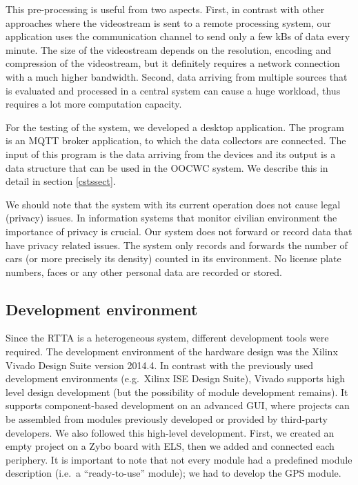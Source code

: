 \documentclass[b5paper,12pt]{report}
\theoremstyle{definition}
\begin{document}
This pre-processing is useful from two aspects. First, in contrast with other approaches where the videostream is sent to a remote processing system, our application uses the communication channel to send only a few kBs of data every minute. The size of the videostream depends on the resolution, encoding and compression of the videostream, but it definitely requires a network connection with a much higher bandwidth. Second, data arriving from multiple sources that is evaluated and processed in a central system can cause a huge workload, thus requires a lot more computation capacity.

For the testing of the system, we developed a desktop application. The program is an MQTT broker application, to which the data collectors are connected. The input of this program is the data arriving from the devices and its output is a data structure that can be used in the OOCWC system. We describe this in detail in section \ref{cstssect}.

We should note that the system with its current operation does not cause legal (privacy) issues. In information systems that monitor civilian environment the importance of privacy is crucial. Our system does not forward or record data that have privacy related issues. The system only records and forwards the number of cars (or more precisely its density) counted in its environment. No license plate numbers, faces or any other personal data are recorded or stored.

\subsection{Development environment}
\label{dev}

Since the RTTA is a heterogeneous system, different development tools were required. The development environment of the hardware design was the Xilinx Vivado Design Suite version 2014.4. In contrast with the previously used development environments (e.g.~Xilinx ISE Design Suite), Vivado supports high level design development (but the possibility of module development remains). It supports component-based development on an advanced GUI, where projects can be assembled from modules previously developed or provided by third-party developers. We also followed this high-level development. First, we created an empty project on a Zybo board with ELS, then we added and connected each periphery. It is important to note that not every module had a predefined module description (i.e.~a \enquote{ready-to-use} module); we had to develop the GPS module.
\end{document}
